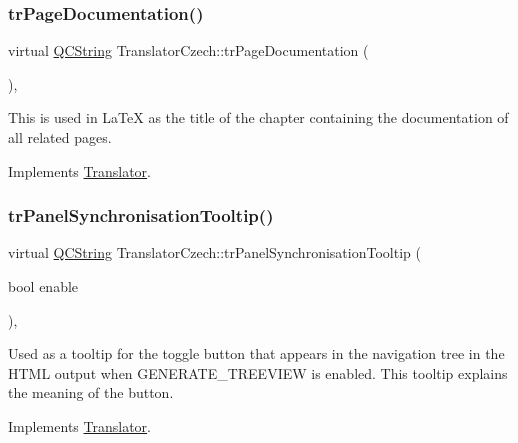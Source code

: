\mbox{\label{class_translator_czech_a012ee12cf33760d5832705654ce1d4a8}} 
\subsubsection{\texorpdfstring{trPageDocumentation()}{trPageDocumentation()}}
{\footnotesize\ttfamily virtual \mbox{\hyperlink{class_q_c_string}{Q\+C\+String}} Translator\+Czech\+::tr\+Page\+Documentation (\begin{DoxyParamCaption}{ }\end{DoxyParamCaption})\hspace{0.3cm}{\ttfamily [inline]}, {\ttfamily [virtual]}}

This is used in La\+TeX as the title of the chapter containing the documentation of all related pages. 

Implements \mbox{\hyperlink{class_translator}{Translator}}.

\mbox{\label{class_translator_czech_affd4bfc31138706a4ae0740d047227c7}} 
\subsubsection{\texorpdfstring{trPanelSynchronisationTooltip()}{trPanelSynchronisationTooltip()}}
{\footnotesize\ttfamily virtual \mbox{\hyperlink{class_q_c_string}{Q\+C\+String}} Translator\+Czech\+::tr\+Panel\+Synchronisation\+Tooltip (\begin{DoxyParamCaption}\item[{bool}]{enable }\end{DoxyParamCaption})\hspace{0.3cm}{\ttfamily [inline]}, {\ttfamily [virtual]}}

Used as a tooltip for the toggle button that appears in the navigation tree in the H\+T\+ML output when G\+E\+N\+E\+R\+A\+T\+E\+\_\+\+T\+R\+E\+E\+V\+I\+EW is enabled. This tooltip explains the meaning of the button. 

Implements \mbox{\hyperlink{class_translator}{Translator}}.

